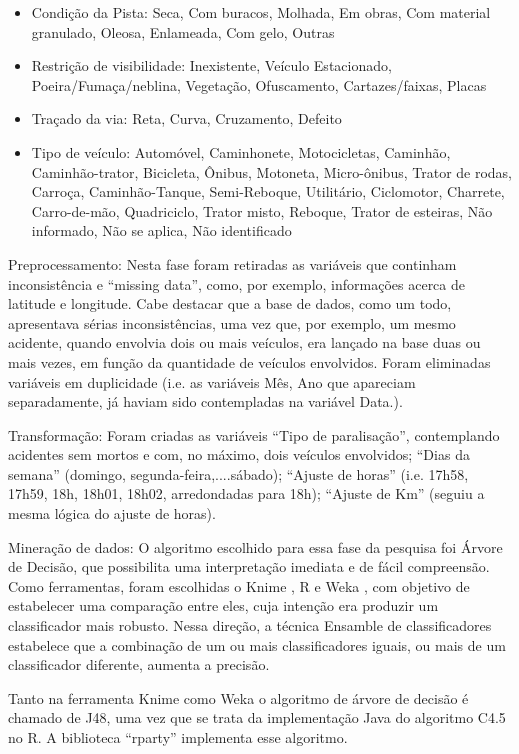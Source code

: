 \begin{itemize}
 \item Condição da Pista: {Seca, Com buracos, Molhada, Em obras, Com material granulado, Oleosa, Enlameada, Com gelo, Outras}
 \item Restrição de visibilidade: {Inexistente, Veículo Estacionado, Poeira/Fumaça/neblina, Vegetação, Ofuscamento, Cartazes/faixas, Placas}
 \item Traçado da via: {Reta, Curva, Cruzamento, Defeito}
 \item Tipo de veículo: {Automóvel, Caminhonete, Motocicletas, Caminhão, Caminhão-trator, Bicicleta, Ônibus, Motoneta, Micro-ônibus, Trator de rodas, Carroça, Caminhão-Tanque, Semi-Reboque, Utilitário, Ciclomotor, Charrete, Carro-de-mão, Quadriciclo, Trator misto, Reboque, Trator de esteiras, Não informado, Não se aplica, Não identificado}
\end{itemize}

Preprocessamento: Nesta fase foram retiradas as variáveis que continham inconsistência e “missing data”, como, por exemplo, informações acerca de latitude e longitude. Cabe destacar que a base de dados, como um todo, apresentava sérias inconsistências, uma vez que, por exemplo,
um mesmo acidente, quando envolvia dois ou mais veículos,
era lançado na base duas ou mais vezes, em função da
quantidade de veículos envolvidos. Foram eliminadas variáveis
em duplicidade (i.e. as variáveis Mês, Ano que apareciam
separadamente, já haviam sido contempladas na variável Data.).

Transformação: Foram criadas as variáveis “Tipo de
paralisação”, contemplando acidentes sem mortos e com, no
máximo, dois veículos envolvidos; “Dias da semana”
(domingo, segunda-feira,....sábado); “Ajuste de horas” (i.e. 17h58, 17h59, 18h, 18h01, 18h02, arredondadas para 18h);
“Ajuste de Km” (seguiu a mesma lógica do ajuste de horas).

Mineração de dados: O algoritmo escolhido para essa fase da pesquisa
foi Árvore de Decisão, que possibilita uma interpretação
imediata e de fácil compreensão. Como ferramentas, foram
escolhidas o Knime \cite{Knime}, R \cite{R-cran} e Weka \cite{Weka}, com objetivo
de estabelecer uma comparação entre eles, cuja intenção era
produzir um classificador mais robusto. Nessa direção, a
técnica Ensamble de classificadores \cite{Bernardini} estabelece que a
combinação de um ou mais classificadores iguais, ou mais de
um classificador diferente, aumenta a precisão. 

Tanto na ferramenta Knime como Weka o algoritmo de árvore de decisão é chamado de J48,
uma vez que se trata da implementação Java do algoritmo
C4.5 no R. A biblioteca “rparty” implementa esse algoritmo.

